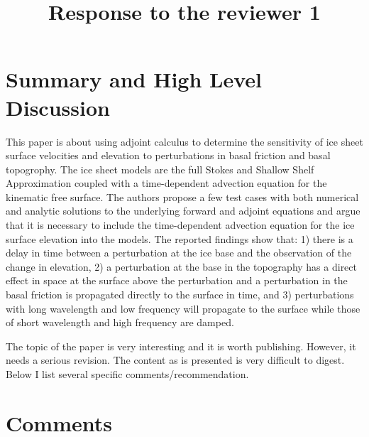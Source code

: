 \documentclass{article}
\begin{document}
\title{Response to the reviewer 1}
\maketitle

\section*{Summary and High Level Discussion}

This paper is about using adjoint calculus to determine the sensitivity of ice sheet surface velocities and elevation to perturbations in basal friction and basal topogrophy. The ice sheet models are the full Stokes and Shallow Shelf Approximation coupled with a time-dependent advection equation for the kinematic free surface. The authors propose a few test cases with both numerical and analytic solutions to the underlying forward and adjoint equations and argue that it is necessary to include the time-dependent advection equation for the ice surface elevation into the models. The reported findings show that: 1) there is a delay in time between a perturbation at the ice base and the observation of the change in elevation, 2) a perturbation at the base in the topography has a direct effect in space at the surface above the perturbation and a perturbation in the basal friction is propagated directly to the surface in time, and 3) perturbations with long wavelength and low frequency will propagate to the surface while those of short wavelength and high frequency are damped.

The topic of the paper is very interesting and it is worth publishing. However, it needs a serious revision. The content as is presented is very difficult to digest. Below I list several specific comments/recommendation.

\section*{Comments}
\end{document}
